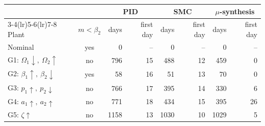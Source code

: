 \begin{tabular}{lcrrrrrr}
\toprule
 & & \multicolumn{2}{c}{PID} & \multicolumn{2}{c}{SMC} & \multicolumn{2}{c}{$\mu$-synthesis} \\
\cmidrule(lr){3-4}\cmidrule(lr){5-6}\cmidrule(lr){7-8}
Plant & $m<\beta_2$ & days & first day & days & first day & days & first day \\
\midrule
Nominal & yes & 0 & -- & 0 & -- & 0 & -- \\
G1: $\Omega_1 \downarrow,\ \Omega_2 \uparrow$ & no & 796 & 15 & 488 & 12 & 459 & 0 \\
G2: $\beta_1 \uparrow,\ \beta_2 \downarrow$ & yes & 58 & 16 & 51 & 13 & 70 & 0 \\
G3: $p_1 \uparrow,\ p_2 \downarrow$ & no & 766 & 17 & 395 & 14 & 330 & 6 \\
G4: $a_1 \uparrow,\ a_2 \uparrow$ & no & 771 & 18 & 434 & 15 & 395 & 26 \\
G5: $\zeta \uparrow$ & no & 1158 & 13 & 1030 & 10 & 1029 & 5 \\
\bottomrule
\end{tabular}
